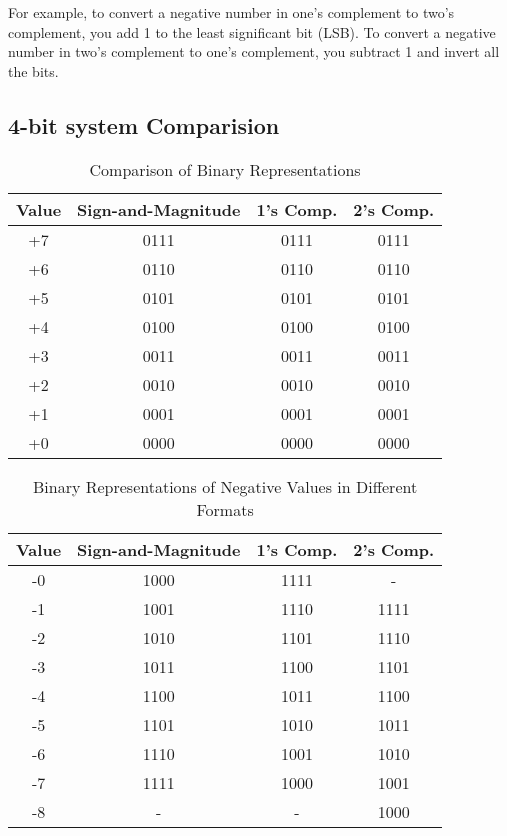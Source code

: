 \documentclass[12pt]{article} %
\begin{document}
For example, to convert a negative number in one's complement to two's complement, you add 1 to the least significant bit (LSB). To convert a negative number in two's complement to one's complement, you subtract 1 and invert all the bits.

\subsection*{4-bit system Comparision}
\begin{table}[h!]
    \centering
    \begin{tabular}{|c|c|c|c|}
    \hline
    \textbf{Value} & \textbf{Sign-and-Magnitude} & \textbf{1's Comp.} & \textbf{2's Comp.} \\
    \hline
    +7 & 0111 & 0111 & 0111 \\
    +6 & 0110 & 0110 & 0110 \\
    +5 & 0101 & 0101 & 0101 \\
    +4 & 0100 & 0100 & 0100 \\
    +3 & 0011 & 0011 & 0011 \\
    +2 & 0010 & 0010 & 0010 \\
    +1 & 0001 & 0001 & 0001 \\
    +0 & 0000 & 0000 & 0000 \\
    \hline
    \end{tabular}
    \caption{Comparison of Binary Representations}
    \end{table}
    
\begin{table}[h!]
    \centering
    \begin{tabular}{|c|c|c|c|}
    \hline
    \textbf{Value} & \textbf{Sign-and-Magnitude} & \textbf{1's Comp.} & \textbf{2's Comp.} \\
    \hline
    -0 & 1000 & 1111 & - \\
    -1 & 1001 & 1110 & 1111 \\
    -2 & 1010 & 1101 & 1110 \\
    -3 & 1011 & 1100 & 1101 \\
    -4 & 1100 & 1011 & 1100 \\
    -5 & 1101 & 1010 & 1011 \\
    -6 & 1110 & 1001 & 1010 \\
    -7 & 1111 & 1000 & 1001 \\
    -8 & -    & -    & 1000 \\
    \hline
    \end{tabular}
    \caption{Binary Representations of Negative Values in Different Formats}
\end{table}
\end{document}
